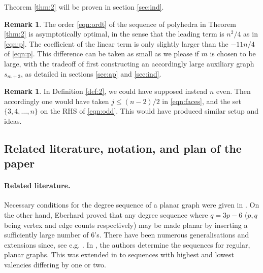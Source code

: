 \documentclass[11pt]{article}
\theoremstyle{definition}
\newtheorem{rem}[thm]{Remark}
\numberwithin{equation}{section}
\begin{document}
Theorem \ref{thm:2} will be proven in section \ref{sec:ind}.

\begin{rem}
The order \eqref{eqn:ordt} of the sequence of polyhedra in Theorem \ref{thm:2} is asymptotically optimal, in the sense that the leading term is $n^2/4$ as in \eqref{eqn:p}. The coefficient of the linear term is only slightly larger than the $-11n/4$ of \eqref{eqn:p}. This difference can be taken as small as we please if $m$ is chosen to be large, with the tradeoff of first constructing an accordingly large auxiliary graph $s_{m+3}$, as detailed in sections \ref{sec:ap} and \ref{sec:ind}.
\end{rem}

\begin{rem}
In Definition \ref{def:2}, we could have supposed instead $n$ even. Then accordingly one would have taken $j\leq (n-2)/2$ in \eqref{eqn:faces}, and the set $\{3,4,\dots, n\}$ on the RHS of \eqref{eqn:odd}. This would have produced similar setup and ideas.
\end{rem}


\subsection{Related literature, notation, and plan of the paper}

\paragraph{Related literature.}
Necessary conditions for the degree sequence of a planar graph were given in \cite{bowen1,chvata}. On the other hand, Eberhard \cite{eberha} proved that any degree sequence where $q=3p-6$ ($p,q$ being vertex and edge counts respectively) may be made planar by inserting a sufficiently large number of $6$'s. There have been numerous generalisations and extensions since, see e.g. \cite{barnet,badagr,fisher,grunba,jendr2,jendr1}. In \cite{hhrt66}, the authors determine the sequences for regular, planar graphs. This was extended in \cite{schhak} to sequences with highest and lowest valencies differing by one or two.






\end{document}
